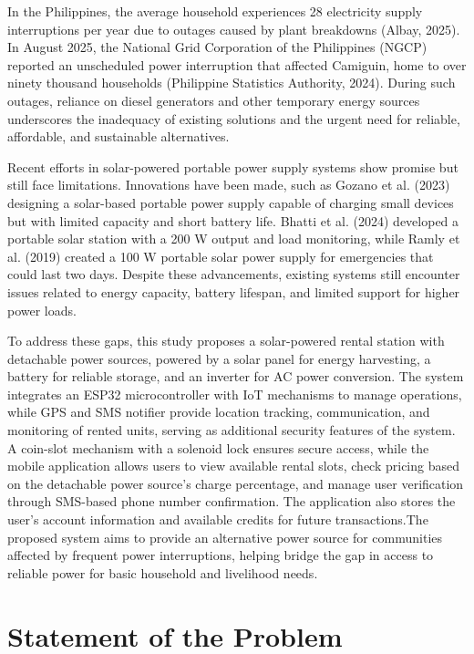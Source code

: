 {In the Philippines, the average household experiences 28 electricity supply interruptions per year due to outages caused by plant breakdowns (Albay, 2025). In August 2025, the National Grid Corporation of the Philippines (NGCP) reported an unscheduled power interruption that affected Camiguin, home to over ninety thousand households (Philippine Statistics Authority, 2024). During such outages, reliance on diesel generators and other temporary energy sources underscores the inadequacy of existing solutions and the urgent need for reliable, affordable, and sustainable alternatives.

Recent efforts in solar-powered portable power supply systems show promise but still face limitations. Innovations have been made, such as Gozano et al. (2023) designing a solar-based portable power supply capable of charging small devices but with limited capacity and short battery life. Bhatti et al. (2024) developed a portable solar station with a 200 W output and load monitoring, while Ramly et al. (2019) created a 100 W portable solar power supply for emergencies that could last two days. Despite these advancements, existing systems still encounter issues related to energy capacity, battery lifespan, and limited support for higher power loads.

To address these gaps, this study proposes a solar-powered rental station with detachable power sources, powered by a solar panel for energy harvesting, a  battery for reliable storage, and an inverter for AC power conversion. The system integrates an ESP32 microcontroller with IoT mechanisms to manage operations, while GPS and SMS notifier provide location tracking, communication, and monitoring of rented units, serving as additional security features of the system. A coin-slot mechanism with a solenoid lock ensures secure access, while the mobile application allows users to view available rental slots, check pricing based on the detachable power source’s charge percentage, and manage user verification through SMS-based phone number confirmation. The application also stores the user’s account information and available credits for future transactions.The proposed system aims to provide an alternative power source for communities affected by frequent power interruptions, helping bridge the gap in access to reliable power for basic household and livelihood needs.

\section{Statement of the Problem}

}
